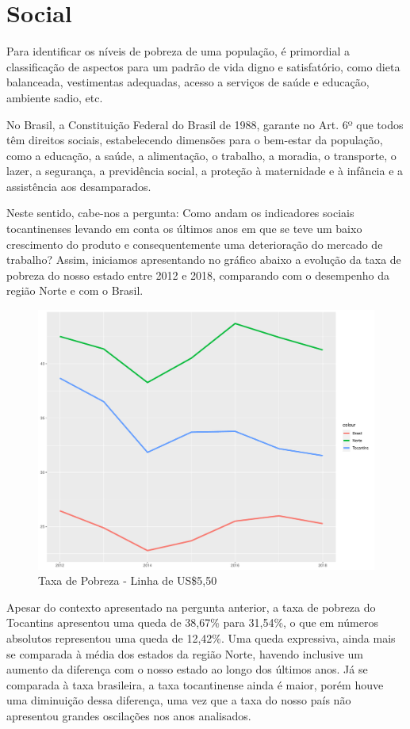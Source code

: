\chapter{Social}
\par Para identificar os níveis de pobreza de uma população, é primordial a classificação de aspectos para um padrão de vida digno e satisfatório, como dieta balanceada, vestimentas adequadas, acesso a serviços de saúde e educação, ambiente sadio, etc.
\par No Brasil, a Constituição Federal do Brasil de 1988, garante no Art. 6º que todos têm direitos sociais, estabelecendo dimensões para o bem-estar da população, como a educação, a saúde, a alimentação, o trabalho, a moradia, o transporte, o lazer, a segurança, a previdência social, a proteção à maternidade e à infância e a assistência aos desamparados.
\par Neste sentido, cabe-nos a pergunta: Como andam os indicadores sociais tocantinenses levando em conta os últimos anos em que se teve um baixo crescimento do produto e consequentemente uma deterioração do mercado de trabalho? Assim, iniciamos apresentando no gráfico abaixo a evolução da taxa de pobreza do nosso estado entre 2012 e 2018, comparando com o desempenho da região Norte e com o Brasil.
\begin{figure}[h]
	\caption{Taxa de Pobreza - Linha de US\$5,50}
	\includegraphics[width=\linewidth]{fig/taxa_pobreza.pdf}
\end{figure}
\par Apesar do contexto apresentado na pergunta anterior, a taxa de pobreza do Tocantins apresentou uma queda de 38,67\% para 31,54\%, o que em números absolutos representou uma queda de 12,42\%. Uma queda expressiva, ainda mais se comparada à média dos estados da região Norte, havendo inclusive um aumento da diferença com o nosso estado ao longo dos últimos anos. Já se comparada à taxa brasileira, a taxa tocantinense ainda é maior, porém houve uma diminuição dessa diferença, uma vez que a taxa do nosso país não apresentou grandes oscilações nos anos analisados.

